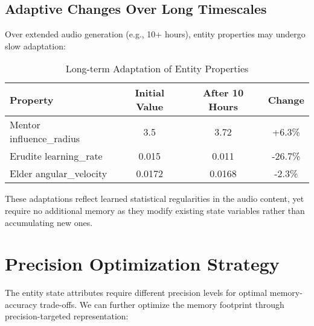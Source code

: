 \subsection{Adaptive Changes Over Long Timescales}

Over extended audio generation (e.g., 10+ hours), entity properties may undergo slow adaptation:

\begin{table}[h]
\centering
\begin{tabular}{|l|c|c|c|}
\hline
\textbf{Property} & \textbf{Initial Value} & \textbf{After 10 Hours} & \textbf{Change} \\
\hline
Mentor influence\_radius & 3.5 & 3.72 & +6.3\% \\
Erudite learning\_rate & 0.015 & 0.011 & -26.7\% \\
Elder angular\_velocity & 0.0172 & 0.0168 & -2.3\% \\
\hline
\end{tabular}
\caption{Long-term Adaptation of Entity Properties}
\end{table}

These adaptations reflect learned statistical regularities in the audio content, yet require no additional memory as they modify existing state variables rather than accumulating new ones.

\section{Precision Optimization Strategy}

The entity state attributes require different precision levels for optimal memory-accuracy trade-offs. We can further optimize the memory footprint through precision-targeted representation:


